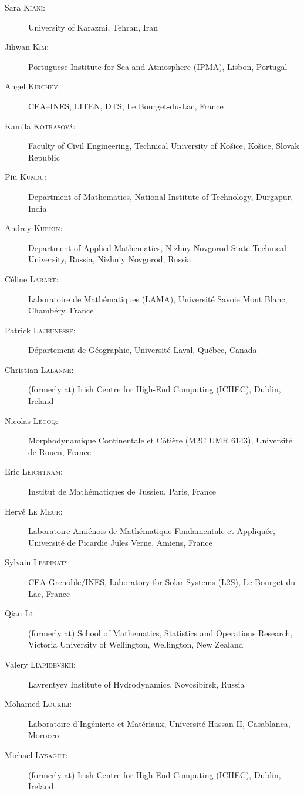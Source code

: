 \begin{description}
  \item[Sara \textsc{Kiani}:] University of Karazmi, Tehran, Iran
  \item[Jihwan \textsc{Kim}:] Portuguese Institute for Sea and Atmosphere (IPMA), Lisbon, Portugal 
  \item[Angel \textsc{Kirchev}:] CEA--INES, LITEN, DTS, Le Bourget-du-Lac, France
  \item[Kamila \textsc{Kotrasová}:] Faculty of Civil Engineering, Technical University of Košice, Košice, Slovak Republic
  \item[Piu \textsc{Kundu}:] Department of Mathematics, National Institute of Technology, Durgapur, India
  \item[Andrey \textsc{Kurkin}:] Department of Applied Mathematics, Nizhny Novgorod State Technical University, Russia, Nizhniy Novgorod, Russia
  \item[C\'eline \textsc{Labart}:] Laboratoire de Math\'ematiques (LAMA), Universit\'e Savoie Mont Blanc, Chamb\'ery, France
  \item[Patrick \textsc{Lajeunesse}:] D\'epartement de G\'eographie, Universit\'e Laval, Qu\'ebec, Canada
  \item[Christian \textsc{Lalanne}:] (formerly at) Irish Centre for High-End Computing (ICHEC), Dublin, Ireland
  \item[Nicolas \textsc{Lecoq}:] Morphodynamique Continentale et C\^oti\`ere (M2C UMR 6143), Universit\'e de Rouen, France
  \item[Eric \textsc{Leichtnam}:] Institut de Math\'ematiques de Jussieu, Paris, France
  \item[Herv\'e \textsc{Le Meur}:] Laboratoire Ami\'enois de Math\'ematique Fondamentale et Appliqu\'ee, Universit\'e de Picardie Jules Verne, Amiens, France
  \item[Sylvain \textsc{Lespinats}:] CEA Grenoble/INES, Laboratory for Solar Systems (L2S), Le Bourget-du-Lac, France
  \item[Qian \textsc{Li}:] (formerly at) School of Mathematics, Statistics and Operations Research, Victoria University of Wellington, Wellington, New Zealand
  \item[Valery \textsc{Liapidevskii}:] Lavrentyev Institute of Hydrodynamics, Novosibirsk, Russia
  \item[Mohamed \textsc{Loukili}:] Laboratoire d'Ing\'enierie et Mat\'eriaux, Universit\'e Hassan II, Casablanca, Morocco
  \item[Michael \textsc{Lysaght}:] (formerly at) Irish Centre for High-End Computing (ICHEC), Dublin, Ireland

\end{description}
